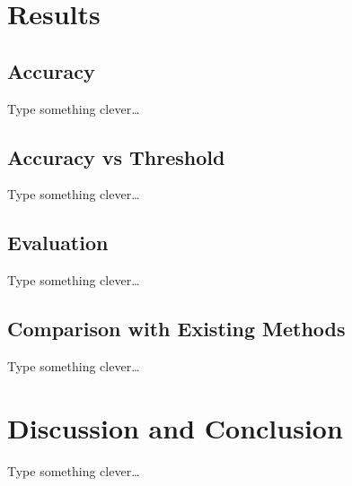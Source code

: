\documentclass[runningheads,a4paper]{llncs}
\begin{document}
\section{Results}
\subsection{Accuracy}
Type something clever\dots

\subsection{Accuracy vs Threshold}
Type something clever\dots

\subsection{Evaluation}
Type something clever\dots

\subsection{Comparison with Existing Methods}
Type something clever\dots

\section{Discussion and Conclusion}
Type something clever\dots



\end{document}

